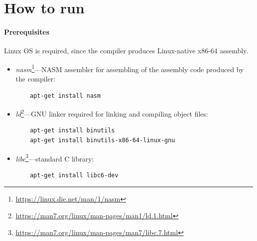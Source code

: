 \documentclass[thesis=M,english]{FITthesis}[2019/12/23]
\begin{document}
\section{How to run}
\paragraph*{Prerequisites} Linux OS is required, since the compiler produces Linux-native x86-64 assembly.
\begin{itemize}
    \item \emph{nasm}\footnote{\url{https://linux.die.net/man/1/nasm}}---NASM assembler for assembling of the assembly code produced by the compiler:
    \begin{verbatim}
    apt-get install nasm
    \end{verbatim}
    
    \item \emph{ld}\footnote{\url{https://man7.org/linux/man-pages/man1/ld.1.html}}---GNU linker required for linking and compiling object files:
    \begin{verbatim}
    apt-get install binutils
    apt-get install binutils-x86-64-linux-gnu
    \end{verbatim}
    
    \item \emph{libc}\footnote{\url{https://man7.org/linux/man-pages/man7/libc.7.html}}---standard C library:
    \begin{verbatim}
    apt-get install libc6-dev
    \end{verbatim}
\end{itemize}
\end{document}
